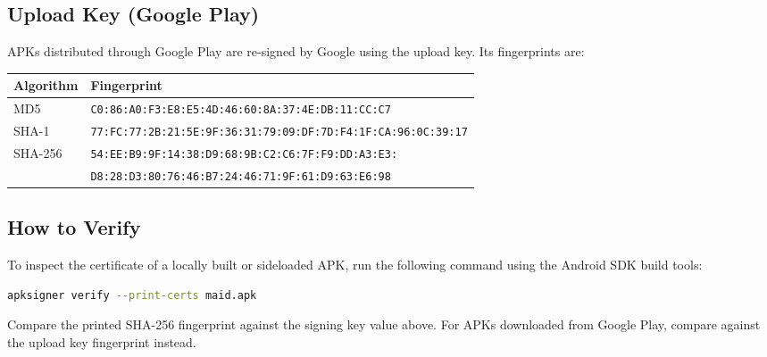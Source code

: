 \documentclass[12pt,a4paper]{article}
\begin{document}
\subsection{Upload Key (Google Play)}

APKs distributed through Google Play are re-signed by Google using the upload key. Its fingerprints are:

\begin{center}
\begin{tabular}{ll}
\toprule
\textbf{Algorithm} & \textbf{Fingerprint} \\
\midrule
MD5    & \texttt{C0:86:A0:F3:E8:E5:4D:46:60:8A:37:4E:DB:11:CC:C7} \\
\addlinespace
SHA-1  & \texttt{77:FC:77:2B:21:5E:9F:36:31:79:09:DF:7D:F4:1F:CA:96:0C:39:17} \\
\addlinespace
SHA-256 & \texttt{54:EE:B9:9F:14:38:D9:68:9B:C2:C6:7F:F9:DD:A3:E3:} \\
        & \texttt{D8:28:D3:80:76:46:B7:24:46:71:9F:61:D9:63:E6:98} \\
\bottomrule
\end{tabular}
\end{center}

\subsection{How to Verify}

To inspect the certificate of a locally built or sideloaded APK, run the following command using the Android SDK build tools:

\begin{lstlisting}[language=bash]
apksigner verify --print-certs maid.apk
\end{lstlisting}

Compare the printed SHA-256 fingerprint against the signing key value above. For APKs downloaded from Google Play, compare against the upload key fingerprint instead.
\end{document}
